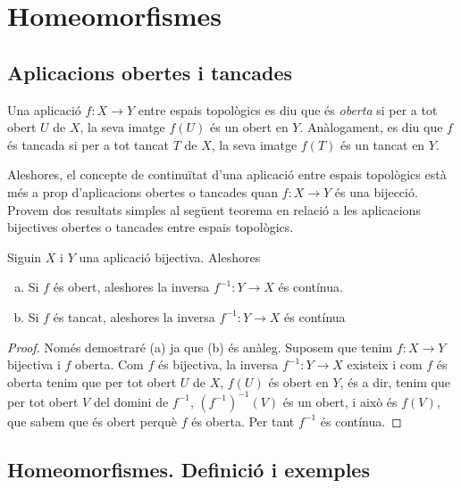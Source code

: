 \documentclass[../main.tex]{subfiles}
\begin{document}
\section{Homeomorfismes}

\subsection{Aplicacions obertes i tancades}

\begin{defi}
\label{def:aplicacioobertatancada} Una aplicació $f:X\rightarrow Y$ entre espais topològics es diu que és \textit{oberta} si per a tot obert $U$ de $X$, la seva imatge $f(U)$ és un obert en $Y$. Anàlogament, es diu que $f$ és tancada si per a tot tancat $T$ de $X$, la seva imatge $f(T)$ és un tancat en $Y$.
\end{defi}

Aleshores, el concepte de continuïtat d'una aplicació entre espais topològics està més a prop d'aplicacions obertes o tancades quan $f:X\rightarrow Y$ és una bijecció. Provem dos resultats simples al següent teorema en relació a les aplicacions bijectives obertes o tancades entre espais topològics.

\begin{prop}
\label{prop:aplicaciooberta} Siguin $X$ i $Y$ una aplicació bijectiva. Aleshores
\begin{enumerate}[(a)]
    \item Si $f$ és obert, aleshores la inversa $f^{-1}:Y\rightarrow X$ és contínua.
    \item Si $f$ és tancat, aleshores la inversa $f^{-1}:Y\rightarrow X$ és contínua
\end{enumerate}
\end{prop}
\begin{proof}
Només demostraré (a) ja que (b) és anàleg. Suposem que tenim $f:X\rightarrow Y$ bijectiva i $f$ oberta. Com $f$ és bijectiva, la inversa $f^{-1}:Y\rightarrow X$ existeix i com $f$ és oberta tenim que per tot obert $U$ de $X$, $f(U)$ és obert en $Y$, és a dir, tenim que per tot obert $V$ del domini de $f^{-1}$, $(f^{-1})^{-1}(V)$ és un obert, i això és $f(V)$, que sabem que és obert perquè $f$ és oberta. Per tant $f^{-1}$ és contínua.
\end{proof}

\subsection{Homeomorfismes. Definició i exemples}
\end{document}
